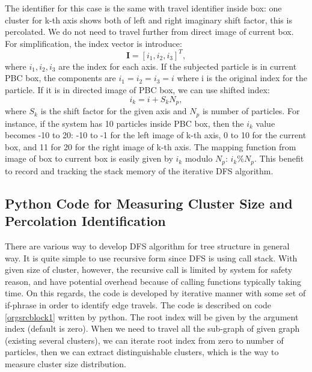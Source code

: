\documentclass[11pt]{article}
\begin{document}
The identifier for this case is the same with travel identifier inside box: one cluster for k-th axis shows both of left and right imaginary shift factor, this is percolated. We do not need to travel further from direct image of current box. For simplification, the index vector is introduce:
\begin{equation}
\mathbf{I} = [i_1, i_2, i_3]^T,
\end{equation}
where \(i_1, i_2, i_3\) are the index for each axis. If the subjected particle is in current PBC box, the components are \(i_1 = i_2 = i_3 = i\) where i is the original index for the particle. If it is in directed image of PBC box, we can use shifted index:
\begin{equation}
i_k = i + S_k N_p,
\end{equation}
where \(S_k\) is the shift factor for the given axis and \(N_p\) is number of particles. For instance, if the system has 10 particles inside PBC box, then the \(i_k\) value becomes -10 to 20: -10 to -1 for the left image of k-th axis, 0 to 10 for the current box, and 11 for 20 for the right image of k-th axis. The mapping function from image of box to current box is easily given by \(i_k\) modulo \(N_p\): \(i_k\% N_p\). This benefit to record and tracking the stack memory of the iterative DFS algorithm.










\subsection{Python Code for Measuring Cluster Size and Percolation Identification}
\label{sec:orgheadline12}
There are various way to develop DFS algorithm for tree structure in general way. It is quite simple to use recursive form since DFS is using call stack. With given size of cluster, however, the recursive call is limited by system for safety reason, and have potential overhead because of calling functions typically taking time. On this regards, the code is developed by iterative manner with some set of if-phrase in order to identify edge travels. The code is described on code \ref{orgsrcblock1} written by python. The root index will be given by the argument index (default is zero). When we need to travel all the sub-graph of given graph (existing several clusters), we can iterate root index from zero to number of particles, then we can extract distinguishable clusters, which is the way to measure cluster size distribution.
\end{document}
